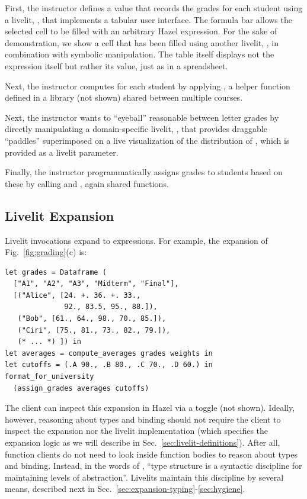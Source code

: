 First, the instructor defines a value 
that records the grades for each student using a livelit, ,
that implements a tabular user interface. The formula bar
allows the selected cell to be filled with an arbitrary Hazel expression.
For the sake of demonstration, we show a cell that has been filled using another livelit,
, in combination with symbolic manipulation.
The table itself displays not the expression itself but rather its value, just as in a spreadsheet.

Next, the instructor computes 
for each student by applying , a helper function
defined in a library  (not shown) shared between multiple courses.

Next, the instructor wants to ``eyeball'' reasonable  between letter grades
by directly manipulating a domain-specific livelit, , that provides draggable ``paddles''
superimposed on a live visualization of the distribution of , which is provided as a livelit parameter.

Finally,
the instructor programmatically assigns grades to students
based on these 
by calling 
and ,
again shared functions.

\subsection{Livelit Expansion}\label{sec:livelit-expansion}
Livelit invocations
expand to expressions.
For example, the expansion of Fig.~\ref{fig:grading}(c) is:

\begin{lstlisting}[xleftmargin=0.2cm]
let grades = Dataframe (
  ["A1", "A2", "A3", "Midterm", "Final"],
  [("Alice", [24. +. 36. +. 33.,
              92., 83.5, 95., 88.]),
   ("Bob", [61., 64., 98., 70., 85.]),
   ("Ciri", [75., 81., 73., 82., 79.]),
   (* ... *) ]) in
let averages = compute_averages grades weights in
let cutoffs = (.A 90., .B 80., .C 70., .D 60.) in
format_for_university
  (assign_grades averages cutoffs)
\end{lstlisting}

The client can inspect this expansion in Hazel via a toggle (not shown).
Ideally, however, reasoning about types and binding
should not require the client to inspect the expansion
nor the livelit implementation (which specifies the expansion logic
as we will describe in Sec.~\ref{sec:livelit-definitions}).
After all, function clients do not need to look inside
function bodies to reason about types and binding.
Instead, in the words of \citet{DBLP:conf/ifip/Reynolds83},
``type structure is a syntactic discipline for maintaining levels of abstraction''.
Livelits maintain this discipline by
several means, described next in Sec.~\ref{sec:expansion-typing}-\ref{sec:hygiene}.


